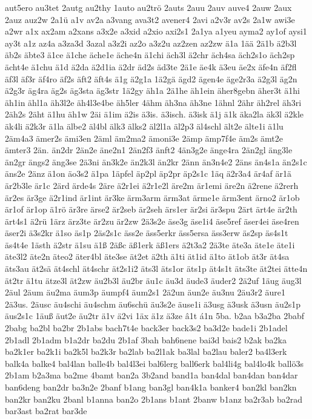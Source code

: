 {aut5ero
au3tet
2autg
au2thy
1auto
au2trö
2auts
2auu
2auv
auve4
2auw
2aux
2auz
auz2w
2a1ü
a1v
av2a
a3vang
ava3t2
avener4
2avi
a2v3r
av2s
2a1w
awi3e
a2wr
a1x
ax2am
a2xans
a3x2e
a3xid
a2xio
axi2s1
2a1ya
a1yeu
ayma2
ay1of
aysi1
ay3t
a1z
az4a
a3za3d
3azal
a3z2i
az2o
a3z2u
az2zen
az2zw
ä1a
1ää
2ä1b
ä2b3l
äb2s
äbte3
ä1ce
ä1che
äche1e
äche4n
ä1chi
äch3l
ä2chr
äch4sa
äch2s1o
äch2sp
ächt4e
ä1chu
ä1d
ä2da
ä2d1ia
ä2dr
äd2s
äd3te
2ä1e
äe4k
ä3eu
äe2x
äfe4n
äf2fl
äf3l
äf3r
äf4ro
äf2s
äft2
äft4s
ä1g
ä2g1a
1ä2gä
ägd2
ägen4e
äge2r3a
ä2g3l
äg2n
ä2g3r
äg4ra
äg2s
äg3sta
äg3str
1ä2gy
äh1a
2ä1he
äh1ein
äher8gebn
äher3t
ä1hi
äh1in
ähl1a
äh3l2e
äh4l3e4be
äh5ler
4ähm
äh3na
äh3ne
1ähnl
2ähr
äh2rel
äh3ri
2äh2s
2äht
ä1hu
äh1w
2äi
ä1im
ä2is
ä3is.
ä3isch.
ä3isk
ä1j
ä1k
äka2la
äk3l
ä2kle
äk4li
ä2k3r
ä1la
älbe2
äl4bl
älk3
älks2
äl2l1a
äl2p3
äl4schl
ält2e
älte1i
ä1lu
2äm4a3
ämer2s
ämi3en
2äml
äm2ma2
ämoni3e
2ämp
ämp7f4e
äm2s
ämt2e
ämter3
2än.
än2dr
2än2e
äne2n1
2än2f3
änft2
4än3g2e
änge4ra
2än2gl
äng3le
än2gr
ängs2
äng3se
2ä3ni
än3k2e
än2k3l
än2kr
2änn
än3n4e2
2äns
än4s1a
än2s1c
äns2e
2änz
ä1on
äo3s2
ä1pa
1äpfel
äp2pl
äp2pr
äp2s1c
1äq
ä2r3a4
är4af
är1ä
är2b3le
är1c
2ärd
ärde4s
2äre
ä2r1ei
ä2r1e2l
äre2m
är1emi
äre2n
ä2rene
ä2rerh
är2es
är3ge
ä2r1ind
är1int
är3ke
ärm3arm
ärm3at
ärme1e
ärm3ent
ärno2
är1ob
är1of
är1op
ä1rö
är3re
ärse2
är2seb
är2seh
ärs1er
är2si
är3spu
2ärt
ärt4e
är2th
ärt4s1
ä2rü
1ärz
ärz3te
är2zu
är2zw
2ä3s2e
äse3g
äse1i4
äse5ref
äser4ei
äse4ren
äser2i
ä3s2kr
ä1so
äs1p
2äs2s1c
äss2e
äss5erkr
äss5ersa
äss3erw
äs2sp
äs4s1t
äs4t4e
1ästh
ä2str
ä1su
ä1ß
2äßc
äß1erk
äß1ers
ä2t3a2
2ä3te
äte3a
äte1e
äte1i
äte3l2
äte2n
äteo2
äter4bl
äte3se
ät2et
ä2th
ä1ti
ät1id
ä1to
ät1ob
ät3r
ät4sa
äts3au
ät2sä
ät4schl
ät4schr
ät2s1i2
äts3l
äts1or
äts1p
ät4s1t
äts3te
ät2tei
ätte4n
ät2tr
ä1tu
ätze3l
ät2zw
äu2b3l
äu2br
äu1c
äu3d
äude3
äuder2
2ä2uf
1äug
äug3l
2äul
2äum
äu2ma
äum3p
äumpf4
äum2s1
2ä2un
äun2e
äu3nu
2äu3r2
äure1
2ä3us.
2äusc
äu4schi
äu4schm
äu6schü
äu3s2e
äuse1i
ä3usg
ä3usk
ä3usn
äu2s1p
äus2s1c
1äuß
äut2e
äu2tr
ä1v
ä2vi
1äx
ä1z
ä3ze
â1t
á1n
5ba.
b2aa
b3a2ba
2babf
2babg
ba2bl
ba2br
2b1abs
bach7t4e
back3er
back3s2
ba3d2e
bade1i
2b1adel
2b1adl
2b1adm
b1a2dr
ba2du
2b1af
3bah
bah6nene
bai3d
bais2
b2ak
ba2ka
ba2k1er
ba2k1i
ba2k5l
ba2k3r
ba2lab
ba2l1ak
ba3lal
ba2lau
baler2
ba4l3erk
balk4a
balke4
bal4lan
balle4b
bal4l3ei
bal6lerg
ball6erk
bal4li4g
bal4lo4k
ballö3s
2b1am
b2a3ma
ba2me
4bamt
ban2a
3b2and
band1a
ban4dal
ban4dan
ban4dar
ban6deng
ban2dr
ba3n2e
2banf
b1ang
ban3gl
ban4k1a
banker4
ban2kl
ban2kn
ban2kr
ban2ku
2banl
b1anna
ban2o
2b1ans
b1ant
2banw
b1anz
ba2r3ab
ba2rad
bar3ast
ba2rat
bar3de
}
